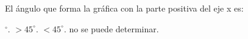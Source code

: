 El ángulo que forma la gráfica con la parte positiva del eje x es:

\begin{oneparchoices}
    $^\circ$.
    \choice $> 45^\circ$.
    \CorrectChoice $< 45^\circ$.
    \choice no se puede determinar.
\end{oneparchoices}